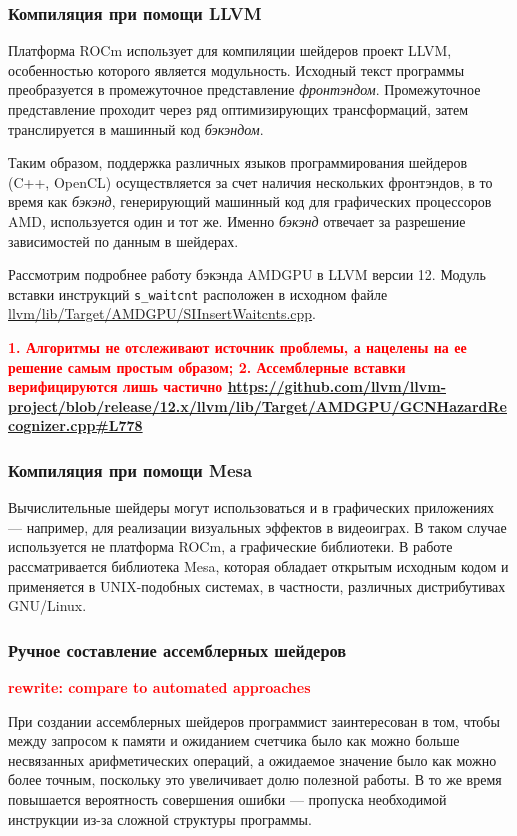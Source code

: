 \documentclass[a4paper,14pt]{extarticle}
\newcommand{\todo}[1]{\textbf{\textcolor{red}{#1}}}
\begin{document}
\subsubsection{Компиляция при помощи LLVM}

Платформа ROCm использует для компиляции шейдеров проект LLVM, особенностью
которого является модульность. Исходный текст программы преобразуется
в промежуточное представление \textit{фронтэндом}. Промежуточное представление
проходит через ряд оптимизирующих трансформаций, затем транслируется в машинный код
\textit{бэкэндом}.

Таким образом, поддержка различных языков программирования шейдеров (C++, OpenCL)
осуществляется за счет наличия нескольких фронтэндов, в то время как \textit{бэкэнд},
генерирующий машинный код для графических процессоров AMD, используется один и тот же.
Именно \textit{бэкэнд} отвечает за разрешение зависимостей по данным в шейдерах.

Рассмотрим подробнее работу бэкэнда AMDGPU в LLVM версии 12. Модуль вставки
инструкций \texttt{s\_waitcnt} расположен в исходном файле
\url{llvm/lib/Target/AMDGPU/SIInsertWaitcnts.cpp}. 

\todo{1. Алгоритмы не отслеживают источник проблемы, а нацелены на ее решение самым простым образом;
2. Ассемблерные вставки верифицируются лишь частично \url{https://github.com/llvm/llvm-project/blob/release/12.x/llvm/lib/Target/AMDGPU/GCNHazardRecognizer.cpp\#L778}}

\subsubsection{Компиляция при помощи Mesa}

Вычислительные шейдеры могут использоваться и в графических приложениях — например,
для реализации визуальных эффектов в видеоиграх. В таком случае используется
не платформа ROCm, а графические библиотеки. В работе рассматривается библиотека
Mesa, которая обладает открытым исходным кодом и применяется в UNIX-подобных
системах, в частности, различных дистрибутивах GNU/Linux.

\subsubsection{Ручное составление ассемблерных шейдеров}

\todo{rewrite: compare to automated approaches}

При создании ассемблерных шейдеров программист заинтересован в том,
чтобы между запросом к памяти и ожиданием счетчика было как можно больше несвязанных
арифметических операций, а ожидаемое значение было как можно более точным, поскольку
это увеличивает долю полезной работы. В то же время повышается вероятность совершения
ошибки — пропуска необходимой инструкции из-за сложной структуры программы.
\end{document}
